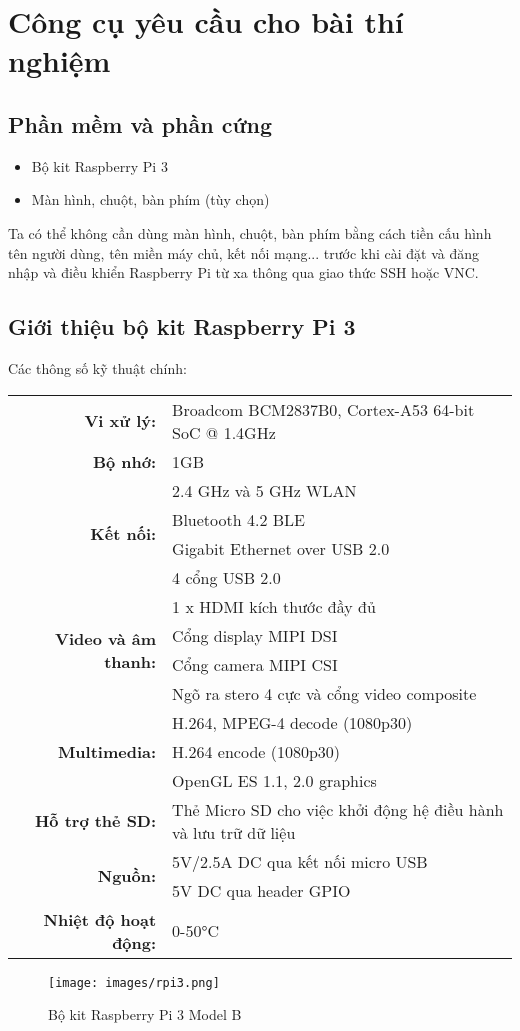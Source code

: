 \section{Công cụ yêu cầu cho bài thí nghiệm}

\subsection{Phần mềm và phần cứng}

\begin{itemize}
    \item Bộ kit Raspberry Pi 3
    \item Màn hình, chuột, bàn phím (tùy chọn)
\end{itemize}

Ta có thể không cần dùng màn hình, chuột, bàn phím 
bằng cách tiền cấu hình tên người dùng, tên miền máy chủ, kết nối mạng... trước khi cài đặt 
và đăng nhập và điều khiển Raspberry Pi từ xa thông qua giao thức SSH hoặc VNC.

\subsection{Giới thiệu bộ kit Raspberry Pi 3}

Các thông số kỹ thuật chính:

{ \centering
\begin{longtable}{rl}
\textbf{Vi xử lý:} & Broadcom BCM2837B0, Cortex-A53 64-bit SoC @ 1.4GHz \\
\textbf{Bộ nhớ:} & 1GB \\
\multirow{4}{*}{\textbf{Kết nối:}} & 2.4 GHz và 5 GHz WLAN \\
 & Bluetooth 4.2 BLE \\
 & Gigabit Ethernet over USB 2.0 \\
 & 4 cổng USB 2.0 \\
\multirow{4}{*}{\textbf{Video và âm thanh:}} & 1 x HDMI kích thước đầy đủ \\
 & Cổng display MIPI DSI \\
 & Cổng camera MIPI CSI \\
 & Ngõ ra stero 4 cực và cổng video composite \\
\multirow{3}{*}{\textbf{Multimedia:}} & H.264, MPEG-4 decode (1080p30) \\
 & H.264 encode (1080p30) \\
 & OpenGL ES 1.1, 2.0 graphics \\
\textbf{Hỗ trợ thẻ SD:} & Thẻ Micro SD cho việc khởi động hệ điều hành và lưu trữ dữ liệu \\
\multirow{2}{*}{\textbf{Nguồn:}} & 5V/2.5A DC qua kết nối micro USB \\
 & 5V DC qua header GPIO \\
\textbf{Nhiệt độ hoạt động:} & 0-50°C
\end{longtable}
}

\begin{figure}[H]
    \centering
    \texttt{[image: images/rpi3.png]}
    \caption{Bộ kit Raspberry Pi 3 Model B}
\end{figure}